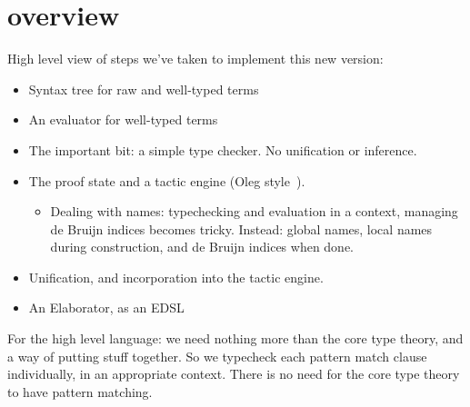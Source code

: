 \section{overview}

High level view of steps we've taken to implement this new version:

\begin{itemize}
\item Syntax tree for raw and well-typed terms
\item An evaluator for well-typed terms
\item The important bit: a simple type checker. No unification or
  inference.
\item The proof state and a tactic engine (Oleg style~\cite{mcbride-thesis}).
\begin{itemize}
  \item Dealing with names: typechecking and evaluation in a context, managing de Bruijn
        indices becomes tricky. Instead: global names, local names during construction,
        and de Bruijn indices when done.
\end{itemize}
\item Unification, and incorporation into the tactic engine.
\item An Elaborator, as an EDSL
\end{itemize}

For the high level language: we need nothing more than the core type theory,
and a way of putting stuff together. So we typecheck each pattern match clause
individually, in an appropriate context. There is no need for the core type
theory to have pattern matching.
